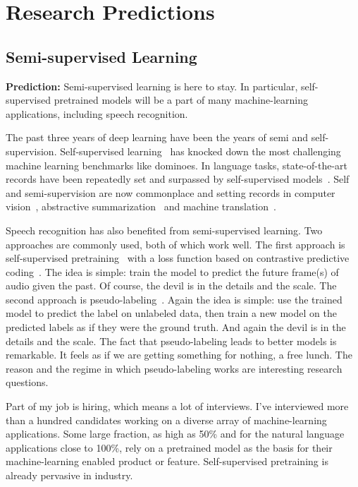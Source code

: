 \section{Research Predictions}
\label{sec:research_predictions}

\subsection{Semi-supervised Learning}

{\bf Prediction:} Semi-supervised learning is here to stay. In particular,
self-supervised pretrained models will be a part of many machine-learning
applications, including speech recognition.

The past three years of deep learning have been the years of semi and
self-supervision. Self-supervised learning~\cite{lecun2021self} has knocked
down the most challenging machine learning benchmarks like dominoes.
In language tasks, state-of-the-art records have been repeatedly set and
surpassed by self-supervised models~\citep{devlin2019bert, radford2019language,
yang2019xlnet}. Self and semi-supervision are now commonplace and setting
records in computer vision~\citep{he2020momentum, chen2020simple,
grill2020bootstrap}, abstractive summarization~\citep{zhang2020pegasus} and
machine translation~\citep{sennrich2016improving}.

Speech recognition has also benefited from semi-supervised learning. Two
approaches are commonly used, both of which work well. The first approach is
self-supervised pretraining~\citep{schneider2019wav2vec, zhang2020pushing} with
a loss function based on contrastive predictive
coding~\citep{oord2018representation}. The idea is simple: train the model to
predict the future frame(s) of audio given the past. Of course, the devil is in
the details and the scale. The second approach is
pseudo-labeling~\citep{lee2013pseudo, kahn2020self, xu2020iterative}. Again the
idea is simple: use the trained model to predict the label on unlabeled data,
then train a new model on the predicted labels as if they were the ground
truth. And again the devil is in the details and the scale. The fact
that pseudo-labeling leads to better models is remarkable. It feels as if we
are getting something for nothing, a free lunch. The reason and the regime in
which pseudo-labeling works are interesting research questions.

Part of my job is hiring, which means a lot of interviews. I've interviewed
more than a hundred candidates working on a diverse array of machine-learning
applications. Some large fraction, as high as 50\% and for the natural language
applications close to 100\%, rely on a pretrained model as the basis for their
machine-learning enabled product or feature. Self-supervised pretraining is
already pervasive in industry.

